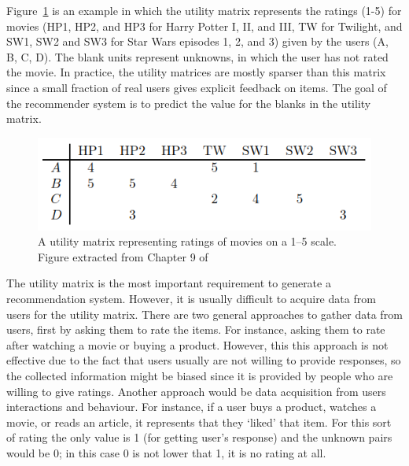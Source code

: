 Figure~\ref{fig:utilityMatrix} is an example in which the utility matrix represents the ratings (1-5) for movies (HP1, HP2, and HP3 for Harry Potter I, II, and III, TW for Twilight, and SW1,
SW2 and SW3 for Star Wars episodes 1, 2, and 3) given by the users (A, B, C, D). The blank units represent unknowns, in which the user has not rated the movie. In practice, the utility matrices are mostly sparser than this matrix since a small fraction of real users gives explicit feedback on items. The goal of the recommender system is to predict the value for the blanks in the utility matrix.


\begin{figure}[ht]
  \centering
  \includegraphics[width=\textwidth]{figures/utilityMatrix.png}
  \caption{A utility matrix representing ratings of movies on a 1–5 scale. Figure extracted from Chapter 9 of~\cite{rajaraman2011mining}}
  \label{fig:utilityMatrix}
\end{figure} 


The utility matrix is the most important requirement to generate a recommendation system. However, it is usually difficult to acquire data from users for the utility matrix. There are two general approaches to gather data from users, first by asking them to rate the items. For instance, asking them to rate after watching a movie or buying a product. However, this this approach is not eﬀective due to the fact that users usually are not willing to provide responses, so the collected information might be biased since it is provided by people who are willing to give ratings. Another approach would be data acquisition from users interactions and behaviour. For instance, if a user
buys a product, watches a movie, or reads an article, it represents that they `liked' that item. For this sort of rating the only value is 1 (for getting user's response) and the unknown pairs would be 0; in this case 0 is not lower that 1, it is no rating at all.


